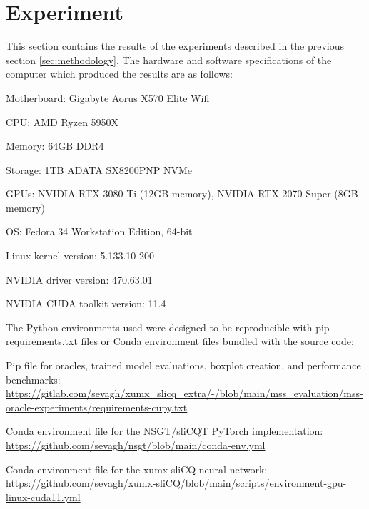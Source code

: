 \documentclass[report.tex]{subfiles}
\begin{document}
\section{Experiment}
\label{sec:experiment}

This section contains the results of the experiments described in the previous section \ref{sec:methodology}. The hardware and software specifications of the computer which produced the results are as follows:
\begin{tight_enumerate}
	\item
		Motherboard: Gigabyte Aorus X570 Elite Wifi
	\item
		CPU: AMD Ryzen 5950X
	\item
		Memory: 64GB DDR4
	\item
		Storage: 1TB ADATA SX8200PNP NVMe
	\item
		GPUs: NVIDIA RTX 3080 Ti (12GB memory), NVIDIA RTX 2070 Super (8GB memory)
	\item
		OS: Fedora 34 Workstation Edition, 64-bit
	\item
		Linux kernel version: 5.133.10-200
	\item
		NVIDIA driver version: 470.63.01
	\item
		NVIDIA CUDA toolkit version: 11.4
\end{tight_enumerate}

The Python environments used were designed to be reproducible with pip requirements.txt files or Conda environment files bundled with the source code:

\begin{tight_enumerate}
	\item
		Pip file for oracles, trained model evaluations, boxplot creation, and performance benchmarks:\\
		\url{https://gitlab.com/sevagh/xumx_slicq_extra/-/blob/main/mss_evaluation/mss-oracle-experiments/requirements-cupy.txt}
	\item
		Conda environment file for the NSGT/sliCQT PyTorch implementation:\\
		\url{https://github.com/sevagh/nsgt/blob/main/conda-env.yml}
	\item
		Conda environment file for the xumx-sliCQ neural network:\\
		\href{https://github.com/sevagh/xumx-sliCQ/blob/main/scripts/environment-gpu-linux-cuda11.yml}{https://github.com/sevagh/xumx-sliCQ/blob/main/scripts/environment-gpu-linux-cuda11.yml}
\end{tight_enumerate}
\end{document}
